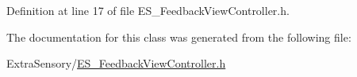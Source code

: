 Definition at line 17 of file E\+S\+\_\+\+Feedback\+View\+Controller.\+h.



The documentation for this class was generated from the following file\+:\begin{DoxyCompactItemize}
\item 
Extra\+Sensory/\hyperlink{_e_s___feedback_view_controller_8h}{E\+S\+\_\+\+Feedback\+View\+Controller.\+h}\end{DoxyCompactItemize}
